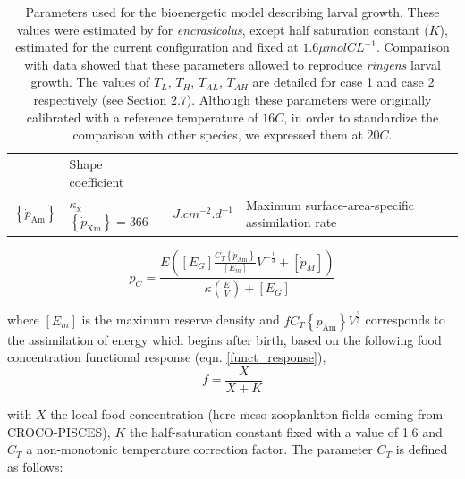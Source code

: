 \begin{itemize}
\begin{table}[H]
\begin{adjustbox}{width=1.2\textwidth}
\begin{tabular}{l|l|l|l}
	& Shape coefficient                               \\
$\left \{ \dot{p}_\mathrm{Am} \right \}$
	& $\kappa_{\mathrm{x}} $ $\left \{ \dot{p}_\mathrm{Xm} \right \}=366$
	& $J.cm^{-2}.d^{-1}$
	& Maximum surface-area-specific assimilation rate\\
\hline
\end{tabular}
\end{adjustbox}
\caption{Parameters used for the bioenergetic model describing larval growth. These values were estimated by \cite{PethRoos2013} for \textit{\gls{encrasicolus}}, except half saturation constant ($K$), estimated for the current configuration and fixed at $1.6 \mu mol CL^{-1}$. Comparison with data showed that these parameters allowed to reproduce \textit{\gls{ringens}} larval growth. The values of $T_{L}$, $T_{H}$, $T_{AL}$, $T_{AH}$ are detailed for case 1 and case 2 respectively (see Section 2.7). Although these parameters were originally calibrated with a reference temperature of $16$\textdegree $C$, in order to standardize the comparison with other species, we expressed them at $20$\textdegree $C$.}
\label{TabDEBparEncra}
\end{table}

\begin{equation}
	\dot{p}_{C} = \frac
					   {E\left ( \left [ E_{G} \right ] \frac{C_{T}\left \{ \dot{p}_\mathrm{Am} \right \}}{\left [ E_{m} \right ]} V^{-\frac{1}{3}}+\left [ \dot{p}_{M} \right ]\right )}
					   {\kappa\left ( \frac{E}{V} \right ) + \left [ E_{G} \right ]}
	\label{pC}
\end{equation}

where $\left[ E_{m} \right]$ is the maximum reserve density and $fC_{T}\left \{ \dot{p}_\mathrm{Am} \right \}V^{\frac{2}{3}}$ corresponds to the assimilation of energy which begins after birth, based on the following food concentration functional response (eqn. \ref{funct_response}),\\

\begin{equation}
	f = \frac{X}
			 {X+K}
    \label{funct_response}
\end{equation}

with $X$ the local food concentration (here meso-zooplankton fields coming from CROCO-PISCES), $K$ the half-saturation constant fixed with a value of 1.6 and $C_{T}$ a non-monotonic temperature correction factor. The parameter $C_{T}$ is defined as follows:\\


\end{itemize}
